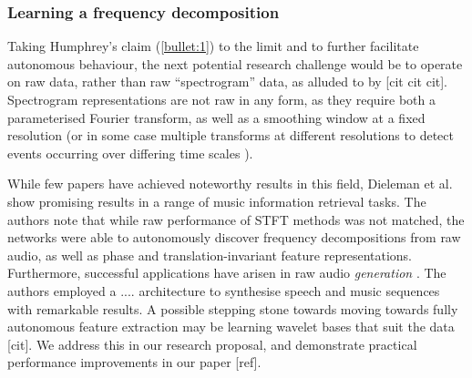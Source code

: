 \documentclass[12pt]{llncs}
\begin{document}

	




\subsubsection{Learning a frequency decomposition}

Taking Humphrey's claim (\ref{bullet:1}) to the limit and to further facilitate autonomous behaviour, the next potential research challenge would be to operate on raw data, rather than raw ``spectrogram'' data, as alluded to by [cit cit cit]. Spectrogram representations are not raw in any form, as they require both a parameterised Fourier transform, as well as a smoothing window at a fixed resolution (or in some case multiple transforms at different resolutions to detect events occurring over differing time scales \cite{espi2015exploiting}).

While few papers have achieved noteworthy results in this field, Dieleman et al. \cite{dieleman2014end} show promising results in a range of music information retrieval tasks. The authors note that while raw performance of STFT methods was not matched, the networks were able to autonomously discover frequency decompositions from raw audio, as well as phase and translation-invariant feature representations. Furthermore, successful applications have arisen in raw audio \emph{generation} \cite{van2016wavenet}. The authors employed a .... architecture to synthesise speech and music sequences with remarkable results. A possible stepping stone towards moving towards fully autonomous feature extraction may be learning wavelet bases that suit the data [cit]. We address this in our research proposal, and demonstrate practical performance improvements in our paper [ref].
\end{document}
